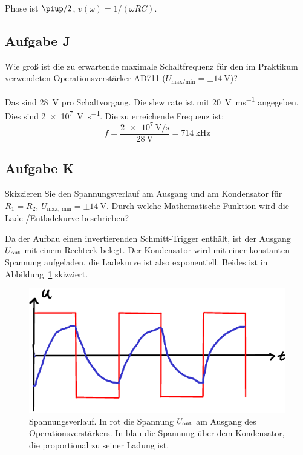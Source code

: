 Phase ist $\piup/2$, $v(\omega) = 1 / (\omega RC)$.

\subsection{Aufgabe J}

\begin{problem}
	Wie groß ist die zu erwartende maximale Schaltfrequenz für den im Praktikum
	verwendeten Operationsverstärker AD711 ($U_\text{max/min} = \pm
	\SI{14}\volt$)?
\end{problem}

Das sind \SI{28}{\volt} pro Schaltvorgang. Die slew rate ist mit
\SI{20}{\volt\per\milli\second} angegeben. Dies sind
\SI{2e7}{\volt\per\second}. Die zu erreichende Frequenz ist:
\[
	f = \frac{\SI{2e7}{\volt\per\second}}{\SI{28}\volt} = \SI{714}{\kilo\hertz}
\]

\FloatBarrier
\subsection{Aufgabe K}

\begin{problem}
	Skizzieren Sie den Spannungsverlauf am Ausgang und am Kondensator für $R_1
	= R_2$, $U_\text{max, min} = \pm \SI{14}\volt$. Durch welche Mathematische
	Funktion wird die Lade-/Entladekurve beschrieben?
\end{problem}

Da der Aufbau einen invertierenden Schmitt-Trigger enthält, ist der Ausgang
$U_\text{out}$ mit einem Rechteck belegt. Der Kondensator wird mit einer konstanten
Spannung aufgeladen, die Ladekurve ist also exponentiell. Beides ist in
Abbildung~\ref{fig:K} skizziert.

\begin{figure}[htbp]
	\centering
	\includegraphics{K.pdf}
	\caption{%
		Spannungsverlauf. In rot die Spannung $U_\text{out}$ am Ausgang des
		Operationsverstärkers. In blau die Spannung über dem Kondensator, die
		proportional zu seiner Ladung ist.
	}
	\label{fig:K}
\end{figure}

